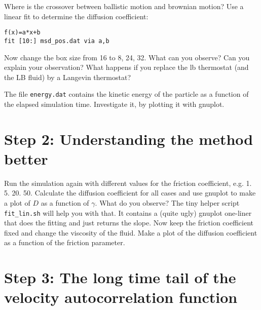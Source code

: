 Where is the crossover between ballistic motion and brownian motion?
Use a linear fit to determine the diffusion coefficient:
{\vspace{0,2cm}\small
\begin{lstlisting}[numbers=none]
f(x)=a*x+b
fit [10:] msd_pos.dat via a,b
\end{lstlisting}\vspace{0,2cm}
}

Now change the box size from 16 to 8, 24, 32. What can you observe?
Can you explain your observation?
What happens if you replace the lb thermostat (and the LB fluid)
by a Langevin thermostat?

The file \lstinline|energy.dat| contains the kinetic energy of the
particle as a function of the elapsed simulation time. Investigate
it, by plotting it with gnuplot. 

\section{Step 2: Understanding the method better}
Run the simulation again with different values for the friction
coefficient, e.g. 1. 5. 20. 50. Calculate the diffusion
coefficient for all cases and use gnuplot to make a plot of
$D$ as a function of $\gamma$. What do you observe?
The tiny helper script \lstinline|fit_lin.sh| will help you with that. It contains
a (quite ugly) gnuplot one-liner that does the fitting and just
returns the slope. Now keep the friction coefficient fixed and
change the viscosity of the fluid. Make a plot of the diffusion coefficient
as a function of the friction parameter.

\section{Step 3: The long time tail of the velocity autocorrelation function}

